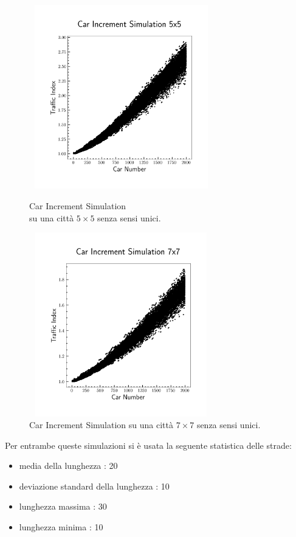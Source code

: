 \documentclass[main.tex]{subfiles}
\begin{document}
        \begin{figure}[H]
            \begin{minipage}{.5\textwidth}
                \centering
                \includegraphics[width=8cm, height=8cm]{car_increment5x5.png}
                \caption{Car Increment Simulation\\ su una città $5 \times 5$ senza sensi unici.}
                \label{fig:3}
            \end{minipage}
            \begin{minipage}{.5\textwidth}
                \centering
                \includegraphics[width=8cm, height=8cm]{car_increment7x7.png}
                \caption{Car Increment Simulation su una città $7 \times 7$ senza sensi unici.}
                \label{fig:4}
            \end{minipage}
        \end{figure}

        Per entrambe queste simulazioni si è usata la seguente statistica delle strade:
        \begin{itemize}
            \item media della lunghezza : 20
            \item deviazione standard della lunghezza : 10
            \item lunghezza massima : 30
            \item lunghezza minima : 10
        \end{itemize}
\end{document}
